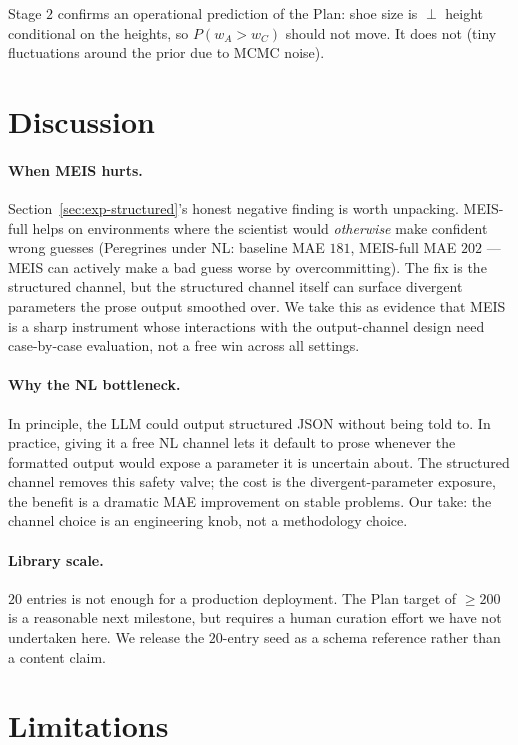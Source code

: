 \documentclass{article}
\begin{document}
Stage $2$ confirms an operational prediction of the Plan: shoe size
is $\perp$ height conditional on the heights, so $P(w_{A} > w_{C})$
should not move. It does not (tiny fluctuations around the prior due
to MCMC noise).

\section{Discussion}
\label{sec:discussion}

\paragraph{When MEIS hurts.} Section~\ref{sec:exp-structured}'s
honest negative finding is worth unpacking. MEIS-full helps on
environments where the scientist would \emph{otherwise} make
confident wrong guesses (Peregrines under NL: baseline MAE $181$,
MEIS-full MAE $202$ --- MEIS can actively make a bad guess worse by
overcommitting). The fix is the structured channel, but the
structured channel itself can surface divergent parameters the prose
output smoothed over. We take this as evidence that MEIS is a sharp
instrument whose interactions with the output-channel design need
case-by-case evaluation, not a free win across all settings.

\paragraph{Why the NL bottleneck.} In principle, the LLM could
output structured JSON without being told to. In practice, giving
it a free NL channel lets it default to prose whenever the formatted
output would expose a parameter it is uncertain about. The
structured channel removes this safety valve; the cost is the
divergent-parameter exposure, the benefit is a dramatic MAE
improvement on stable problems. Our take: the channel choice is
an engineering knob, not a methodology choice.

\paragraph{Library scale.} $20$ entries is not enough for a
production deployment. The Plan target of $\geq 200$ is a
reasonable next milestone, but requires a human curation effort
we have not undertaken here. We release the $20$-entry seed as a
schema reference rather than a content claim.

\section{Limitations}
\label{sec:limitations}
\end{document}

